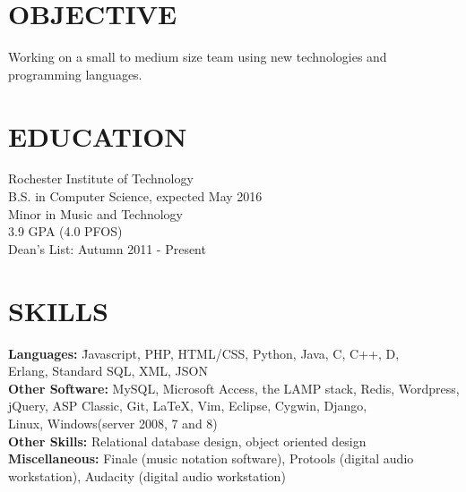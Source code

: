 \documentclass[line,margin]{res}
\begin{document}
\address{6000 Reynolds Dr, \#1482\\ Rochester, NY 14623}
\address{(646) 320-9143\\leeavital@gmail.com}


\begin{resume}
 
\section{OBJECTIVE}  Working on a small to medium size team using 
                     new technologies and programming languages.      
\section{EDUCATION}  Rochester Institute of Technology \\ 
                     B.S. in  Computer Science,  expected May 2016 \\
	                 Minor in Music and Technology\\
	                 3.9 GPA (4.0 PFOS) \\
	                 Dean's List: Autumn 2011 - Present
 
\section{SKILLS} 
 \vspace{-2ex}
	\begin{tabbing}
    {\bf Languages:} \hspace{.5in} 	\= Javascript,  PHP, HTML/CSS, Python, Java, C, C++, D, \\
				                    \> Erlang, Standard SQL, XML, JSON \\
	{\bf Other Software:}           \> MySQL, Microsoft Access, the LAMP stack, Redis, Wordpress,  \\ 
				                    \>	jQuery, ASP Classic, Git, LaTeX, Vim, Eclipse, Cygwin, Django, \\
				                    \>  Linux, Windows(server 2008, 7 and 8) \\
	
	{\bf Other Skills:} \> Relational database design, object oriented design \\
	
	{\bf Miscellaneous: } \> Finale (music notation software), Protools (digital audio \\ 
				 \>workstation),  Audacity (digital audio workstation)
	\end{tabbing}
	

\end{resume}
\end{document}
